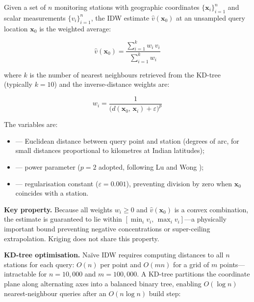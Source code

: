 \documentclass[12pt,a4paper]{article}
\begin{document}
Given a set of $n$ monitoring stations with geographic coordinates
$\{\mathbf{x}_i\}_{i=1}^n$ and scalar measurements $\{v_i\}_{i=1}^n$, the
IDW estimate $\hat{v}(\mathbf{x}_0)$ at an unsampled query location
$\mathbf{x}_0$ is the weighted average:

\begin{equation}
\hat{v}(\mathbf{x}_0)
  = \frac{\displaystyle\sum_{i=1}^{k} w_i\,v_i}
         {\displaystyle\sum_{i=1}^{k} w_i}
\label{eq:idw}
\end{equation}

\noindent where $k$ is the number of nearest neighbours retrieved from the
KD-tree (typically $k = 10$) and the inverse-distance weights are:

\begin{equation}
w_i = \frac{1}{\bigl(d(\mathbf{x}_0,\,\mathbf{x}_i) + \varepsilon\bigr)^p}
\label{eq:idwweight}
\end{equation}

\noindent The variables are:
\begin{itemize}[leftmargin=2.5cm, label={}]
\item[$d(\cdot,\cdot)$] --- Euclidean distance between query point and station
                            (degrees of arc, for small distances proportional
                            to kilometres at Indian latitudes);
\item[$p$]               --- power parameter ($p = 2$ adopted, following
                            Lu and Wong \cite{lu2008});
\item[$\varepsilon$]     --- regularisation constant ($\varepsilon = 0.001$),
                            preventing division by zero when $\mathbf{x}_0$
                            coincides with a station.
\end{itemize}

\noindent\textbf{Key property.} Because all weights $w_i \geq 0$ and
$\hat{v}(\mathbf{x}_0)$ is a convex combination, the estimate is guaranteed
to lie within $[\min_i v_i,\, \max_i v_i]$---a physically important bound
preventing negative concentrations or super-ceiling extrapolation. Kriging
does not share this property.

\noindent\textbf{KD-tree optimisation.} Na\"ive IDW requires computing
distances to all $n$ stations for each query: $O(n)$ per point and
$O(mn)$ for a grid of $m$ points---intractable for $n = 10{,}000$ and
$m = 100{,}000$. A KD-tree \cite{bentley1975} partitions the coordinate plane
along alternating axes into a balanced binary tree, enabling $O(\log n)$
nearest-neighbour queries after an $O(n \log n)$ build step:
\end{document}
